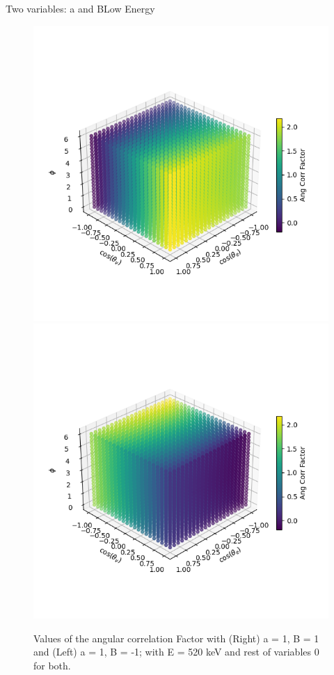 \documentclass{beamer}
\begin{document}
\begin{frame}{Two variables: a and B}{Low Energy}
	\begin{figure}
		\centering
		\includegraphics[width=0.4\paperwidth]{plots/posa_posB_lowE_3D}
		\includegraphics[width=0.4\paperwidth]{plots/posa_negB_lowE_3D}
		\caption{Values of the angular correlation Factor with (Right) a = 1, B = 1 and (Left) a = 1, B = -1; with E = 520 keV and rest of variables 0 for both.}
	\end{figure}
\end{frame}
\end{document}
